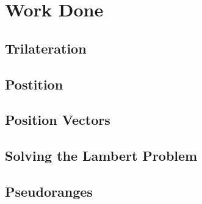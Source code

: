 \documentclass[../main.tex]{subfiles}
\begin{document}
\section{Work Done}
\subsection{Trilateration}
\label{ssec:trilateration}

\subsection{Postition}
\label{ssec:position}

\subsection{Position Vectors}
\label{ssec:vectors}

\subsection{Solving the Lambert Problem}
\label{ssec:lambert}

\subsection{Pseudoranges}
\label{ssec:PRN}
\end{document}
